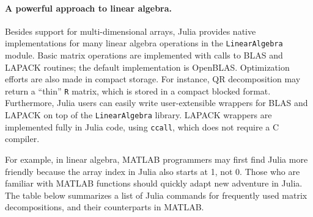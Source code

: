\paragraph{A powerful approach to linear algebra.}
Besides support for multi-dimensional arrays, Julia provides native implementations for many linear algebra operations in the \texttt{LinearAlgebra} module. Basic matrix operations are implemented with calls to BLAS and LAPACK routines; the default implementation is OpenBLAS. Optimization efforts are also made in compact storage. For instance, QR decomposition may return a ``thin'' \texttt{R} matrix, which is stored in a compact blocked format. Furthermore, Julia users can easily write user-extensible wrappers for BLAS and LAPACK on top of the \texttt{LinearAlgebra} library. LAPACK wrappers are implemented fully in Julia code, using \texttt{ccall}, which does not require a C compiler. 

For example, in linear algebra, MATLAB programmers may first find Julia more friendly because the array index in Julia also starts at 1, not 0. Those who are familiar with MATLAB functions should quickly adapt new adventure in Julia. The table below summarizes a list of Julia commands for frequently used matrix decompositions, and their counterparts in MATLAB. 

	\begin{table}[H]
        \centering
        \caption{Interfaces of commonly seen matrix decompositions in Julia and MATLAB}
        \label{freq-decomp}
      \end{table}

